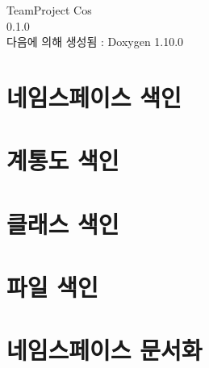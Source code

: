 \documentclass[twoside]{book}
\newcommand{\+}{\discretionary{\mbox{\scriptsize$\hookleftarrow$}}{}{}}
\newcommand{\clearemptydoublepage}{%
    \newpage{\pagestyle{empty}\cleardoublepage}%
  }
\begin{document}
  \raggedbottom
    \hypersetup{pageanchor=false,
                bookmarksnumbered=true,
                pdfencoding=unicode
               }
  \begin{titlepage}
  \vspace*{7cm}
  \begin{center}%
  {\Large Team\+Project Cos}\\
  [1ex]\large 0.\+1.\+0 \\
  \vspace*{1cm}
  {\large 다음에 의해 생성됨 \+:  Doxygen 1.10.0}\\
  \end{center}
  \end{titlepage}
  \clearemptydoublepage
  \tableofcontents
  \clearemptydoublepage
  \hypersetup{pageanchor=true}
\chapter{네임스페이스 색인}

\chapter{계통도 색인}

\chapter{클래스 색인}

\chapter{파일 색인}

\chapter{네임스페이스 문서화}

\end{document}
